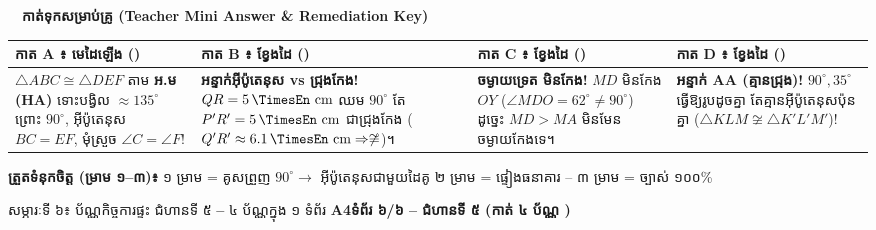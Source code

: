 \documentclass[a4paper,10pt]{article}
\newcommand{\en}[1]{{\TimesEn #1}}
\newcommand{\enbf}[1]{{\TimesEn\bfseries #1}}
\newcommand{\unit}[1]{\,\text{\en{#1}}}
\newcommand{\cnum}[1]{\mbox{\fontsize{10pt}{12pt}\selectfont\ding{\numexpr181+#1\relax}}}
\newcommand{\scissors}{\ding{34}}
\newcommand{\tri}[1]{\ensuremath{\triangle #1}}
\newcommand{\ang}[1]{\ensuremath{\angle #1}}
\newcommand{\cg}{\ensuremath{\cong}}
\newcommand{\ncg}{\ensuremath{\not\cong}}
\newcommand{\pagebanner}[2]{%
  \begin{tcolorbox}[
    enhanced, sharp corners, colback=headgray, colframe=black,
    boxrule=1.1pt, boxsep=1pt, top=3pt, bottom=3pt, left=6pt, right=6pt,
    after skip=4pt
  ]
    {\muol\fontsize{9.6pt}{14pt}\selectfont #1}\hfill{\fontsize{8.0pt}{11.5pt}\selectfont\textbf{#2}}
  \end{tcolorbox}%
}
\begin{document}
\vspace{6pt}

\noindent\scissors\ \dotfill\ \textbf{កាត់ទុកសម្រាប់គ្រូ (\en{Teacher Mini Answer \& Remediation Key})} \dotfill\ \scissors

\vspace{4pt}
\begin{tcolorbox}[
  enhanced, sharp corners, colback=panelgray, colframe=black,
  boxrule=1.0pt, boxsep=1pt, top=4pt, bottom=4pt, left=5pt, right=5pt
]
  \fontsize{7.75pt}{10.9pt}\selectfont
  \renewcommand{\arraystretch}{1.10}
  \begin{tabular}{|L{4.05cm}|L{4.25cm}|L{4.25cm}|L{4.45cm}|}
    \hline
    \textbf{កាត \en{A} ៖ មេដៃឡើង ()} &
    \textbf{កាត \en{B} ៖ ខ្វែងដៃ ()} &
    \textbf{កាត \en{C} ៖ ខ្វែងដៃ ()} &
    \textbf{កាត \en{D} ៖ ខ្វែងដៃ ()} \\ \hline
    $\tri{ABC}\cg\tri{DEF}$ តាម \textbf{អ.ម (\en{HA})} ទោះបង្វិល $\approx 135^\circ$ ព្រោះ $90^\circ$, អ៊ីប៉ូតេនុស $BC=EF$, មុំស្រួច $\ang{C}=\ang{F}$! &
    \textbf{អន្ទាក់អ៊ីប៉ូតេនុស \en{vs} ជ្រុងកែង!} $QR=5\unit{cm}$ ឈម $90^\circ$ តែ $P'R'=5\unit{cm}$ ជាជ្រុងកែង ($Q'R'\approx 6.1\unit{cm} \Rightarrow \ncg$)។ &
    \textbf{ចម្ងាយទ្រេត មិនកែង!} $MD$ មិនកែង $OY$ ($\ang{MDO}=62^\circ \neq 90^\circ$) ដូច្នេះ $MD > MA$ មិនមែនចម្ងាយកែងទេ។ &
    \textbf{អន្ទាក់ \en{AA} (គ្មានជ្រុង)!} $90^\circ, 35^\circ$ ធ្វើឱ្យរូបដូចគ្នា តែគ្មានអ៊ីប៉ូតេនុសប៉ុនគ្នា ($\tri{KLM}\ncg\tri{K'L'M'}$)! \\ \hline
  \end{tabular}
  \par\vspace{2.5pt}
  \textbf{ត្រួតទំនុកចិត្ត (ម្រាម ១\en{--}៣)៖} ១ ម្រាម = គូសព្រួញ $90^\circ \to$ អ៊ីប៉ូតេនុសជាមួយដៃគូ \hspace{0.2cm}\en{|}\hspace{0.2cm} ២ ម្រាម = ផ្ទៀងធនាគារ \cnum{1}--\cnum{5} \hspace{0.2cm}\en{|}\hspace{0.2cm} ៣ ម្រាម = ច្បាស់ ១០០\%
\end{tcolorbox}

\clearpage

\pagebanner{សម្ភារៈទី ៦៖ ប័ណ្ណកិច្ចការផ្ទះ ជំហានទី ៥ \enbf{--} ៤ ប័ណ្ណក្នុង ១ ទំព័រ \enbf{A4}}{ទំព័រ ៦/៦ \en{--} ជំហានទី ៥ (កាត់ ៤ ប័ណ្ណ \scissors)}
\end{document}
